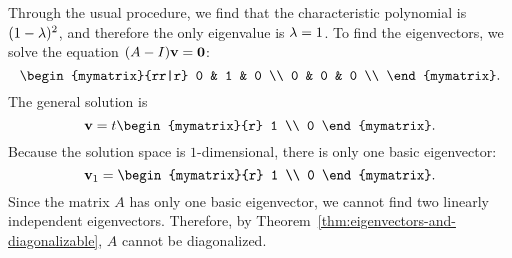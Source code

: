 \begin{solution}
  Through the usual procedure, we find that the characteristic
  polynomial is $(1-\lambda)^2$, and therefore the only eigenvalue is
  $\lambda=1$. To find the eigenvectors, we solve the equation
  $(A-I)\vect{v} = \vect{0}$:
  \begin{equation*}
    \begin{mymatrix}{rr|r}
      0 & 1 & 0 \\
      0 & 0 & 0 \\
    \end{mymatrix}.
  \end{equation*}
  The general solution is
  \begin{equation*}
    \vect{v} = t\begin{mymatrix}{r} 1 \\ 0 \end{mymatrix}.
  \end{equation*}
  Because the solution space is $1$-dimensional, there is only one basic
  eigenvector:
  \begin{equation*}
    \vect{v}_1 = \begin{mymatrix}{r} 1 \\ 0 \end{mymatrix}.
  \end{equation*}
  Since the matrix $A$ has only one basic eigenvector, we cannot find
  two linearly independent eigenvectors. Therefore, by
  Theorem~\ref{thm:eigenvectors-and-diagonalizable}, $A$ cannot be
  diagonalized.
\end{solution}
